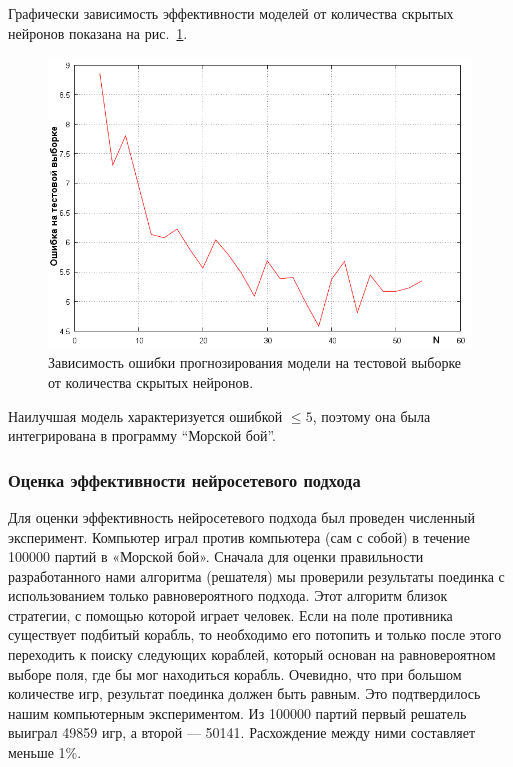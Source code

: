 \documentclass[12pt, a4paper, oneside]{article}
\begin{document}
Графически зависимость эффективности моделей от количества скрытых нейронов показана на рис.~\ref{fig:effectiveness}. 
\begin{figure}[t!]
\begin{center}
	\includegraphics[scale=0.5]{effectiveness.png}
	\caption{Зависимость ошибки прогнозирования модели на тестовой выборке от количества скрытых нейронов.}
	\label{fig:effectiveness}
        \vspace{-0.5cm}
\end{center}
\end{figure}

Наилучшая модель характеризуется ошибкой $\le 5$, поэтому она была интегрирована в программу ``Морской бой''.

\subsubsection{Оценка эффективности нейросетевого подхода}

Для оценки эффективность нейросетевого подхода был проведен численный эксперимент. Компьютер играл против компьютера (сам с собой) в течение 100000 партий в «Морской бой». Сначала для оценки правильности разработанного нами алгоритма (решателя) мы проверили результаты поединка с использованием только равновероятного подхода. Этот алгоритм близок стратегии, с помощью которой играет человек. Если на поле противника существует подбитый корабль, то необходимо его потопить и только после этого переходить к поиску следующих кораблей, который основан на равновероятном выборе поля, где бы мог находиться корабль. Очевидно, что при большом количестве игр, результат поединка должен быть равным. Это подтвердилось нашим компьютерным экспериментом. Из 100000 партий первый решатель выиграл 49859 игр, а второй — 50141. Расхождение между ними составляет меньше 1\%. 
\end{document}
